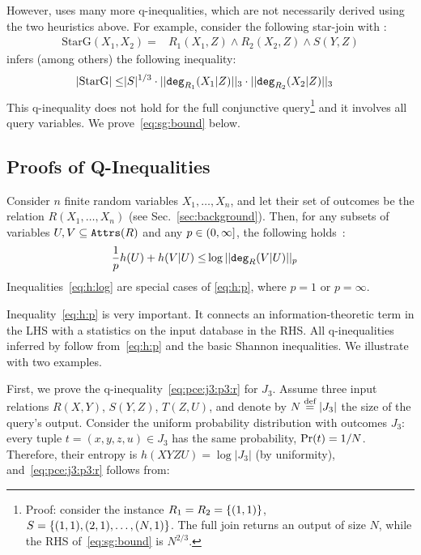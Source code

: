 However, \system uses many more q-inequalities, which are not
necessarily derived using the two heuristics above.  For example,
consider the following star-join with \groupby:
%
\begin{align*}
  \text{StarG}(X_1,X_2) = & R_1(X_1,Z)\wedge R_2(X_2,Z)\wedge S(Y,Z)
\end{align*}
%
\system infers (among others) the following inequality:
%
\begin{align}
  |\text{StarG}| \leq & |S|^{1/3}\cdot ||\texttt{deg}_{R_1}(X_1|Z)||_3\cdot||\texttt{deg}_{R_2}(X_2|Z)||_3\label{eq:sg:bound}
\end{align}
%
This q-inequality does not hold for the full conjunctive
query\footnote{Proof: consider the instance $R_1=R_2=\{(1,1)\}$,
  $S=\{(1,1),(2,1),\ldots,(N,1)\}$.  The full join returns an output
  of size $N$, while the RHS of~\eqref{eq:sg:bound} is $N^{2/3}$.} and
it involves all query variables.  We prove~\eqref{eq:sg:bound} below.

\subsection{Proofs of Q-Inequalities}
\label{subsec:sec:lpbound:proofs}

Consider $n$ finite random variables $X_1, \ldots, X_n$, and let their
set of outcomes be the relation $R(X_1, \ldots, X_n)$ (see
Sec.~\ref{sec:background}).  Then, for any subsets of variables
$U, V \subseteq \texttt{Attrs}(R)$ and any $p \in (0,\infty]$, the
following holds~\cite{DBLP:journals/pacmmod/KhamisNOS24}:
%
\begin{align}
  \frac{1}{p}h(U)+h(V|U) \leq & \log ||\texttt{deg}_R(V|U)||_p \label{eq:h:p}
\end{align}
%
Inequalities~\eqref{eq:h:log} are special cases of \eqref{eq:h:p}, where 
$p=1$ or $p=\infty$.

Inequality~\eqref{eq:h:p} is very important.  It connects an
information-theoretic term in the LHS with a statistics on the input
database in the RHS.  All q-inequalities inferred by \system follow
from~\eqref{eq:h:p} and the basic Shannon inequalities.  We illustrate
with two examples.

First, we prove the q-inequality~\eqref{eq:pce:j3:p3:r} for $J_3$.
Assume three input relations $R(X,Y)$, $S(Y,Z)$, $T(Z,U)$, and denote
by $N \stackrel{\text{def}}{=} |J_3|$ the size of the query's output. Consider the
uniform probability distribution with outcomes $J_3$: every tuple
$t = (x,y,z,u)\in J_3$ has the same probability, $\mathop{\textnormal{Pr}}(t)= 1/N$.
Therefore, their entropy is $h(XYZU)=\log |J_3|$ (by uniformity),
and~\eqref{eq:pce:j3:p3:r} follows from:
%

